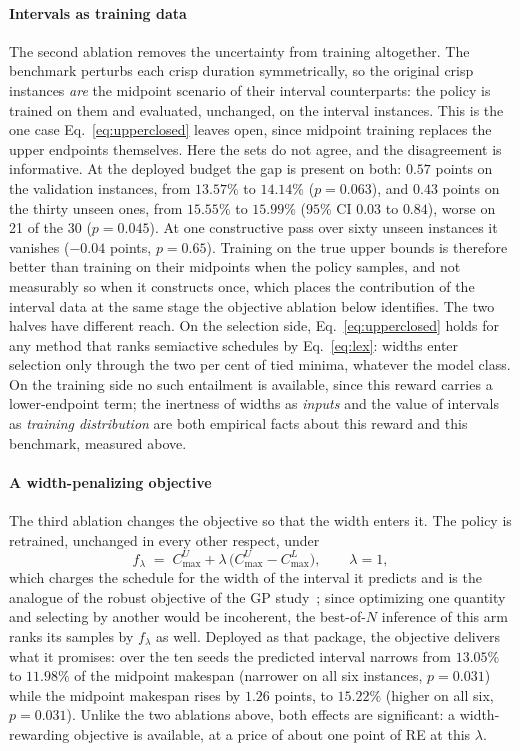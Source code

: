 \documentclass[preprint,authoryear,12pt]{elsarticle}
\theoremstyle{definition}
\theoremstyle{remark}
\begin{document}
\paragraph{Intervals as training data} The second ablation removes
the uncertainty from training altogether. The benchmark perturbs each
crisp duration symmetrically, so the original crisp instances
\emph{are} the midpoint scenario of their interval counterparts: the
policy is trained on them and evaluated, unchanged, on the interval
instances. This is the one case Eq.~\eqref{eq:upperclosed} leaves
open, since midpoint training replaces the upper endpoints
themselves. Here the sets do not agree, and the disagreement is
informative. At the deployed budget
the gap is present on both: $0.57$ points on the validation
instances, from $13.57\%$ to $14.14\%$ ($p=0.063$), and $0.43$ points
on the thirty unseen ones, from $15.55\%$ to $15.99\%$ ($95\%$ CI
$0.03$ to $0.84$), worse on 21 of the 30 ($p=0.045$). At one
constructive pass over sixty unseen instances it vanishes
($-0.04$ points, $p=0.65$). Training on the true upper bounds is
therefore better than training on their midpoints when the policy
samples, and not measurably so when it constructs once, which places
the contribution of the interval data at the same stage the objective
ablation below identifies. The two halves have different reach. On
the selection side, Eq.~\eqref{eq:upperclosed} holds for any method
that ranks semiactive schedules by Eq.~\eqref{eq:lex}: widths enter
selection only through the two per cent of tied minima, whatever the
model class. On the training side no such entailment is available,
since this reward carries a lower-endpoint term; the inertness of
widths as \emph{inputs} and the value of intervals as
\emph{training distribution} are both empirical facts about this
reward and this benchmark, measured above.

\paragraph{A width-penalizing objective} The third ablation changes
the objective so that the width enters it. The policy is retrained,
unchanged in every other respect, under
\begin{equation}
\label{eq:robust}
f_\lambda \;=\; C^U_{\max} + \lambda\,\bigl(C^U_{\max}-C^L_{\max}\bigr),
\qquad \lambda=1,
\end{equation}
which charges the schedule for the width of the interval it predicts
and is the analogue of the robust objective of the GP study~\citep{DiazGP2026};
since optimizing one quantity and selecting by another would be
incoherent, the best-of-$N$ inference of this arm ranks its samples by
$f_\lambda$ as well. Deployed as that package, the objective delivers
what it promises: over the ten seeds the predicted interval narrows
from $13.05\%$ to $11.98\%$ of the midpoint makespan (narrower on all
six instances, $p=0.031$) while the midpoint makespan rises by
$1.26$ points, to $15.22\%$ (higher on all six, $p=0.031$). Unlike
the two ablations above, both effects are significant: a
width-rewarding objective is available, at a price of about one point
of RE at this $\lambda$.
\end{document}
